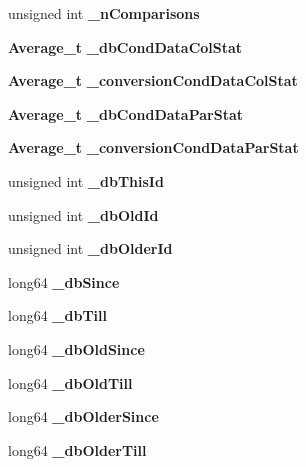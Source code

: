 \begin{DoxyCompactItemize}
\item 
unsigned int {\bfseries \_\-nComparisons}\label{classTestCondDataProcessor_a99239f4d1dea89a63a6a5aaf9335234f}

\item 
{\bf Average\_\-t} {\bfseries \_\-dbCondDataColStat}\label{classTestCondDataProcessor_afd771b2d29220eba7939d808a2bc2649}

\item 
{\bf Average\_\-t} {\bfseries \_\-conversionCondDataColStat}\label{classTestCondDataProcessor_a497455f92c3e9d25c6e5196d524f23fa}

\item 
{\bf Average\_\-t} {\bfseries \_\-dbCondDataParStat}\label{classTestCondDataProcessor_ab36e64ae6efd5beda7394b10a4a35cfe}

\item 
{\bf Average\_\-t} {\bfseries \_\-conversionCondDataParStat}\label{classTestCondDataProcessor_a96b2e4b44453e3e665fc85c3f2151085}

\item 
unsigned int {\bfseries \_\-dbThisId}\label{classTestCondDataProcessor_a8d19763767c1c22599790ada414cae0f}

\item 
unsigned int {\bfseries \_\-dbOldId}\label{classTestCondDataProcessor_abb286759ea8799f0ac1297689869c185}

\item 
unsigned int {\bfseries \_\-dbOlderId}\label{classTestCondDataProcessor_a99017f95cb539604e69267c9e6d825ac}

\item 
long64 {\bfseries \_\-dbSince}\label{classTestCondDataProcessor_ad05bec5578a01fc52ad4ce3d84f3aade}

\item 
long64 {\bfseries \_\-dbTill}\label{classTestCondDataProcessor_a344dc9a4fc25a9c9bcae9fd9c38cb067}

\item 
long64 {\bfseries \_\-dbOldSince}\label{classTestCondDataProcessor_ad233d7eadb8628d8630e7e472dd54e0d}

\item 
long64 {\bfseries \_\-dbOldTill}\label{classTestCondDataProcessor_a289234a58bddccd87f6468259c1d4c11}

\item 
long64 {\bfseries \_\-dbOlderSince}\label{classTestCondDataProcessor_a583de6d8771a9bb9f456b00aed5a2156}

\item 
long64 {\bfseries \_\-dbOlderTill}\label{classTestCondDataProcessor_ad22a60287fb2832a0d63c384c2153697}


\end{DoxyCompactItemize}
